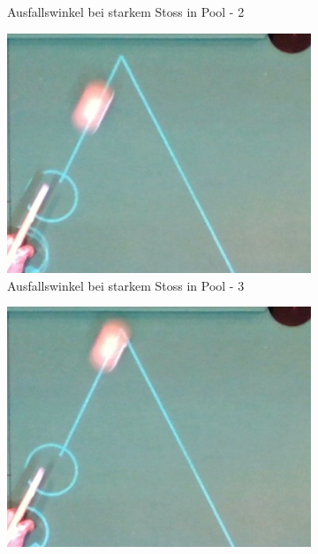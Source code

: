 \begin{figure}[h!]
\begin{subfigure}[b]{0.2\textwidth}
        \caption{Ausfallswinkel bei starkem Stoss in Pool - 2}
        \label{fig:rebound_angle_fast_pool_2}
    \end{subfigure}
    \hfill
    \begin{subfigure}[b]{0.2\textwidth}
        \centering
        \includegraphics[width=1.0\linewidth]{../common/04_results/resources/simulation/rebound_angle_fast_pool/00_rail_rebound_angle_fast_pool_03.png}
        \caption{Ausfallswinkel bei starkem Stoss in Pool - 3}
        \label{fig:rebound_angle_fast_pool_3}
    \end{subfigure}
    \hfill
    \begin{subfigure}[b]{0.2\textwidth}
        \centering
        \includegraphics[width=1.0\linewidth]{../common/04_results/resources/simulation/rebound_angle_fast_pool/00_rail_rebound_angle_fast_pool_04.png}

\end{subfigure}
\end{figure}

